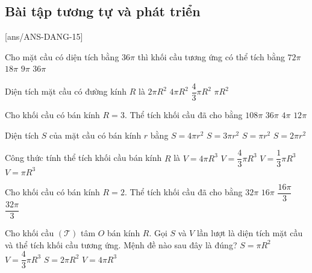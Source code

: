 \subsection{Bài tập tương tự và phát triển}
[ans/ANS-DANG-15]
	\begin{ex}%
	Cho mặt cầu có diện tích bằng $36\pi $ thì khối cầu tương ứng có thể tích bằng
	\choice
	{$72\pi $}
	{$18\pi $}
	{$9\pi $}
	{\True $36\pi $}
	\end{ex}
	\begin{ex}%
	Diện tích mặt cầu có đường kính $R$ là
	\choice
	{$2\pi R^2$}
	{$4\pi R^2$}
	{$\dfrac{4}{3}\pi R^2$}
	{\True $\pi R^2$}
	\end{ex}
	\begin{ex}%
	Cho khối cầu có bán kính $R=3$. Thể tích khối cầu đã cho bằng
	\choice
	{$108\pi$}
	{\True $36\pi $}
	{$4\pi $}
	{$12\pi $}
	\end{ex}
	\begin{ex}%
	Diện tích $S$ của mặt cầu có bán kính $r$ bằng
	\choice
	{\True $S=4\pi r^2$}
	{$S=3\pi r^2$}
	{$S=\pi r^2$}
	{$S=2\pi r^2$}
	\end{ex}
	\begin{ex}%
	Công thức tính thể tích khối cầu bán kính $R$ là
	\choice
	{$V=4\pi R^3$}
	{\True $V=\dfrac{4}{3}\pi R^3$}
	{$V=\dfrac{1}{3}\pi R^3$}
	{$V=\pi R^3$}
	\end{ex}
	\begin{ex}%
	Cho khối cầu có bán kính $R=2$. Thể tích khối cầu đã cho bằng
	\choice
	{$32\pi $}
	{$16\pi $}
	{$\dfrac{16\pi}{3}$}
	{\True $\dfrac{32\pi}{3}$}
	\end{ex}
	\begin{ex}%
	Cho khối cầu $(\mathcal{T})$ tâm $O$ bán kính $R$. Gọi $S$ và $V$ lần lượt là diện tích mặt cầu và thể tích khối cầu tương ứng. Mệnh đề nào sau đây là đúng?
	\choice
	{$S=\pi R^2$}
	{\True $V=\dfrac{4}{3}\pi R^3$}
	{$S=2\pi R^2$}
	{$V=4\pi R^3$}
	\end{ex}
